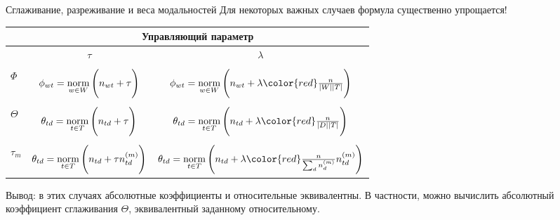 \begin{frame}{Сглаживание, разреживание и веса модальностей}
Для некоторых важных случаев формула существенно упрощается!

\begin{table}[]
\begin{tabular}{l|c|c|}
         & \multicolumn{2}{c}{Управляющий параметр}                                                                                                      \\ \hline
         & $\tau$                                          & $\lambda$                                                                                   \\ \hline 
         &    &          \\[-5pt]
$\Phi$   & $\phi_{wt} = \mathop{\mathrm{norm}}\limits_{w \in W}\Bigg(n_{wt} + \tau\Bigg)$    & $\phi_{wt} = \norm_{w \in W}\Bigg(n_{wt} + \lambda {\color{red}\frac{n}{|W||T|}}\Bigg)$    \\[15pt] \hline
         &    &          \\[-5pt]
$\Theta$ & $\theta_{td} = \mathop{\mathrm{norm}}\limits_{t \in T} \Bigg(n_{td} + \tau\Bigg)$ & $\theta_{td} = \norm_{t \in T} \Bigg(n_{td} + \lambda {\color{red}\frac{n}{|D| |T|}}\Bigg)$ \\[15pt]  \hline
         &    &          \\[-5pt]
$\tau_m$ & $\theta_{td} = \mathop{\mathrm{norm}}\limits_{t \in T} \Bigg(n_{td} + \tau n_{td}^{(m)}\Bigg)$ & $\theta_{td} = \norm_{t \in T} \Bigg(n_{td} + \lambda  {
    \color{red}\frac{n}{\sum_d n_d^{(m)}}
    } n_{td}^{(m)}\Bigg)$ \\[15pt]  \hline
\end{tabular}
\end{table}
Вывод: в этих случаях абсолютные коэффициенты и относительные эквивалентны. В частности, можно вычислить абсолютный коэффициент сглаживания $\Theta$, эквивалентный заданному относительному.
\end{frame}


